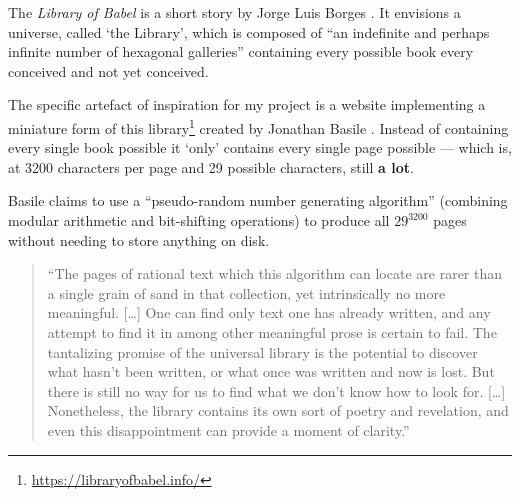 The \textit{Library of Babel} is a short story by Jorge Luis Borges \autocite{Borges1964}. It envisions a universe, called `the Library', which is composed of ``an indefinite and perhaps infinite number of hexagonal galleries'' containing every possible book every conceived and not yet conceived.

The specific artefact of inspiration for my project is a website implementing a miniature form of this library\footnote{\url{https://libraryofbabel.info/}} created by Jonathan Basile \autocite{Basile2015}. Instead of containing every single book possible it `only' contains every single page possible --- which is, at 3200 characters per page and 29 possible characters, still \textbf{a lot}.

Basile claims to use a ``pseudo-random number generating algorithm'' (combining modular arithmetic and bit-shifting operations) to produce all $29^{3200}$ pages without needing to store anything on disk.

\begin{quote}
  ``The pages of rational text which this algorithm can locate are rarer than a single grain of sand in that collection, yet intrinsically no more meaningful.
  [\ldots]
  One can find only text one has already written, and any attempt to find it in among other meaningful prose is certain to fail. The tantalizing promise of the universal library is the potential to discover what hasn’t been written, or what once was written and now is lost. But there is still no way for us to find what we don’t know how to look for.
  [\ldots]
  Nonetheless, the library contains its own sort of poetry and revelation, and even this disappointment can provide a moment of clarity.'' \autocite{Basile2015}
\end{quote}



\stopcontents[chapters]
